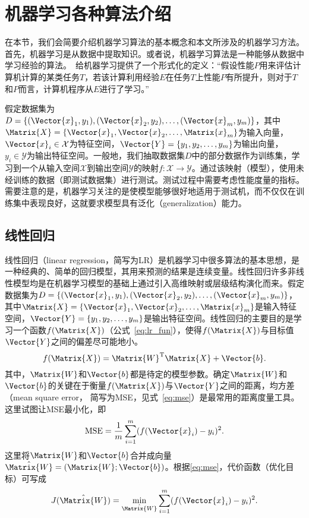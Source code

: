\section{机器学习各种算法介绍}\label{sec:机器学习各种算法介绍}

在本节，我们会简要介绍机器学习算法的基本概念和本文所涉及的机器学习方法。首先，机器学习是从数据中提取知识。或者说，机器学习算法是一种能够从数据中学习经验的算法。~\citet{Mitchell1997Machine}给机器学习提供了一个形式化的定义：``假设性能$P$用来评估计算机计算的某类任务$T$，若该计算利用经验$E$在任务$T$上性能$P$有所提升，则对于$T$和$P$而言，计算机程序从$E$进行了学习。''

假定数据集为$D=\{(\Vector{x}_1,y_1),(\Vector{x}_2,y_2),\ldots,(\Vector{x}_m,y_m)\}$，其中$\Matrix{X}=\{\Vector{x}_1,\Vector{x}_2,\ldots,\Matrix{x}_m\}$为输入向量，$\Vector{x}_i\in\mathcal{X}$为特征空间，$\Vector{Y}=\{y_1,y_2,\ldots,y_m\}$为输出向量，$y_i\in\mathcal{Y}$为输出特征空间。一般地，我们抽取数据集$D$中的部分数据作为训练集，学习到一个从输入空间$\mathcal{X}$到输出空间$\mathcal{Y}$的映射$f:\mathcal{X}\rightarrow\mathcal{Y}$。通过该映射（模型），使用未经训练的数据（即测试数据集）进行测试。测试过程中需要考虑性能度量的指标。需要注意的是，机器学习关注的是使模型能够很好地适用于测试机，而不仅仅在训练集中表现良好，这就要求模型具有泛化（generalization）能力。


\subsection{线性回归}\label{sec:线性回归}

线性回归（linear regression，简写为LR）是机器学习中很多算法的基本思想，是一种经典的、简单的回归模型，其用来预测的结果是连续变量。线性回归许多非线性模型均是在机器学习模型的基础上通过引入高维映射或层级结构演化而来。假定数据集为$D=\{(\Vector{x}_1,y_1),(\Vector{x}_2,y_2),\ldots,(\Vector{x}_m,y_m)\}$，其中$\Matrix{X}=\{\Vector{x}_1,\Vector{x}_2,\ldots,\Matrix{x}_m\}$是输入特征空间，$\Vector{Y}=\{y_1,y_2,\ldots,y_m\}$是输出特征空间。线性回归的主要目的是学习一个函数$f(\Matrix{X})$（公式~\ref{eq:lr_fun}），使得$f(\Matrix{X})$与目标值$\Vector{Y}$之间的偏差尽可能地小。
\begin{equation}
  \label{eq:lr_fun}
  f(\Matrix{X})=\Matrix{W}^{\text{T}}\Matrix{X}+\Vector{b}.
\end{equation}
其中，$\Matrix{W}$和$\Vector{b}$都是待定的模型参数。确定$\Matrix{W}$和$\Vector{b}$的关键在于衡量$f(\Matrix{X})$与$\Vector{Y}$之间的距离，均方差（mean square error， 简写为MSE，见式~\ref{eq:mse}）是最常用的距离度量工具。这里试图让MSE最小化，即
\begin{equation}
  \label{eq:mse}
  \text{MSE}=\frac{1}{m}\sum_{i=1}^{m}(f(\Vector{x}_i)-y_i)^2.
\end{equation}
这里将$\Matrix{W}$和$\Vector{b}$合并成向量$\hat{\Matrix{W}}=(\Matrix{W};\Vector{b})$。根据\ref{eq:mse}，代价函数（优化目标）可写成
\begin{equation}
  \label{eq:lr_loss}
  J(\hat{\Matrix{W}})=\min_{\hat{\Matrix{W}}}\sum_{i=1}^{m}(f(\Vector{x}_i)-y_i)^2.
\end{equation}

